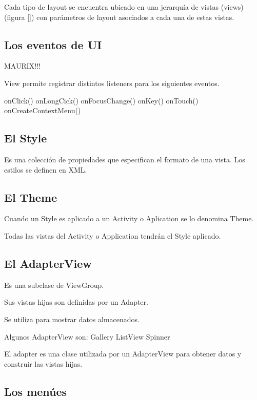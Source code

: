 Cada tipo de layout se encuentra ubicado en una jerarqu\'ia de vistas (views) (figura \ref{}) con par\'ametros de layout asociados a cada una de estas vistas. 


\subsection{Los eventos de \ac{UI}}
\label{subsec:dev.ui.events}

MAURIX!!!

View permite registrar distintos listeners para los siguientes  eventos.

onClick()
onLongCick()
onFocusChange()
onKey()
onTouch()
onCreateContextMenu()

\subsection{El Style}
\label{subsec:dev.style}

Es una colecci\'on de propiedades que especifican el formato de una vista. Los estilos se definen en XML.

\subsection{El Theme}
\label{subsec:dev.theme}

Cuando un Style es aplicado a un Activity o Aplication se lo denomina Theme.

Todas las vistas del Activity o Application tendr\'an el Style aplicado.

\subsection{El AdapterView}
\label{subsec:dev.adapterView}

Es una subclase de ViewGroup.

Sus vistas hijas son definidas por un Adapter.

Se utiliza para mostrar datos almacenados.

Algunos AdapterView son:
Gallery
ListView
Spinner

El adapter es una clase utilizada por un AdapterView para obtener datos y  construir las vistas hijas.

\subsection{Los men\'ues}
\label{subsec:dev.menus}

